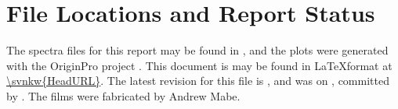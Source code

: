 \documentclass[draftcls,onecolumn]{IEEEtran}
\begin{document}
\section{File Locations and Report Status}
The spectra files for this report may be found in , and the plots were generated with the OriginPro project .
This document is may be found in \LaTeX format at \url{\svnkw{HeadURL}}.  
The latest revision for this file is \svnrev, and was on \svndate, committed by \svnauthor.
The films were fabricated by Andrew Mabe.
\end{document}
